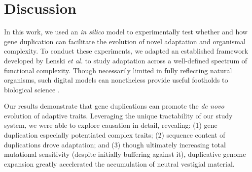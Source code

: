 


\section{Discussion} \label{sec:discussion}

In this work, we used an \textit{in silico} model to experimentally test whether and how gene duplication can facilitate the evolution of novel adaptation and organismal complexity.
To conduct these experiments, we adapted an established framework developed by Lenski \textit{et al.} \citep{Lenski2003Evolutionary} to study adaptation across a well-defined spectrum of functional complexity.
Though necessarily limited in fully reflecting natural organisms, such digital models can nonetheless provide useful footholds to biological science \citep{Fortuna2022,Adami2000Evolution,Zaman2014Coevolution,Fortuna2017GenotypePhenotype,Gupta2016,Goldsby2012,Goldsby2014,Lenski1999,Misevic2005,Clune2008,Clune2012,Covert2013,Elena2007,Wilke2001,Hazen2007}.

Our results demonstrate that gene duplications can promote the \textit{de novo} evolution of adaptive traits.
Leveraging the unique tractability of our study system, we were able to explore causation in detail, revealing:
(1) gene duplication especially potentiated complex traits;
(2) sequence content of duplications drove adaptation; and
(3) though ultimately increasing total mutational sensitivity (despite initially buffering against it), duplicative genome expansion greatly accelerated the accumulation of neutral vestigial material.

